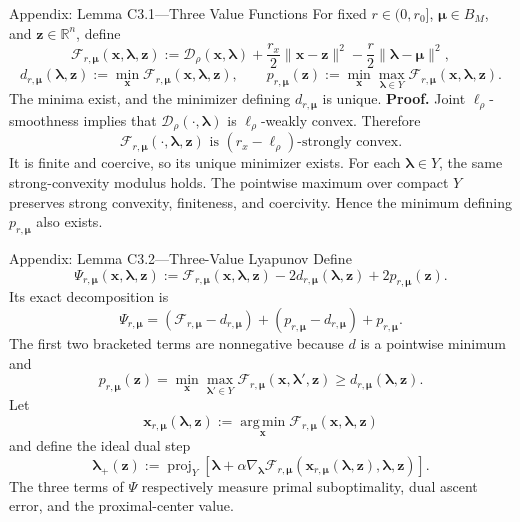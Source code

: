 \documentclass[handout,compress,9pt]{beamer}
\newcommand{\RR}{\mathbb{R}}
\newcommand{\bx}{\bm{x}}
\newcommand{\bz}{\bm{z}}
\newcommand{\bmu}{\bm{\mu}}
\newcommand{\blmbd}{\bm{\lambda}}
\begin{document}
\begin{frame}{Appendix: Lemma C3.1---Three Value Functions
\hfill\hyperlink{appendix:contents}{}}
\hypertarget{appendix:candidate-frozen}{}
\scriptsize
For fixed $r\in(0,r_0]$, $\bmu\in B_M$, and $\bz\in\RR^n$, define
\begin{equation*}
  \mathcal F_{r,\bmu}(\bx,\blmbd,\bz)
  :=\mathcal D_\rho(\bx,\blmbd)
  +\frac{r_x}{2}\|\bx-\bz\|^2
  -\frac r2\|\blmbd-\bmu\|^2,
\end{equation*}
\begin{equation*}
  d_{r,\bmu}(\blmbd,\bz)
  :=\min_{\bx}\mathcal F_{r,\bmu}(\bx,\blmbd,\bz),
  \qquad
  p_{r,\bmu}(\bz)
  :=\min_{\bx}\max_{\blmbd\in Y}\mathcal F_{r,\bmu}(\bx,\blmbd,\bz).
\end{equation*}
The minima exist, and the minimizer defining $d_{r,\bmu}$ is unique.
\noindent\textbf{Proof.}
Joint $\ell_\rho$-smoothness implies that
$\mathcal D_\rho(\cdot,\blmbd)$ is $\ell_\rho$-weakly convex.  Therefore
\begin{equation*}
  \mathcal F_{r,\bmu}(\cdot,\blmbd,\bz)
  \text{ is }(r_x-\ell_\rho)\text{-strongly convex}.
\end{equation*}
It is finite and coercive, so its unique minimizer exists.  For each
$\blmbd\in Y$, the same strong-convexity modulus holds.  The pointwise maximum
over compact $Y$ preserves strong convexity, finiteness, and coercivity.
Hence the minimum defining $p_{r,\bmu}$ also exists.
\end{frame}

\begin{frame}{Appendix: Lemma C3.2---Three-Value Lyapunov
\hfill\hyperlink{appendix:contents}{}}
\scriptsize
Define
\begin{equation*}
  \Psi_{r,\bmu}(\bx,\blmbd,\bz)
  :=\mathcal F_{r,\bmu}(\bx,\blmbd,\bz)
  -2d_{r,\bmu}(\blmbd,\bz)+2p_{r,\bmu}(\bz).
\end{equation*}
Its exact decomposition is
\begin{equation*}
  \Psi_{r,\bmu}
  =(\mathcal F_{r,\bmu}-d_{r,\bmu})
  +(p_{r,\bmu}-d_{r,\bmu})+p_{r,\bmu}.
\end{equation*}
The first two bracketed terms are nonnegative because $d$ is a pointwise
minimum and
\begin{equation*}
  p_{r,\bmu}(\bz)
  =\min_{\bx}\max_{\blmbd'\in Y}\mathcal F_{r,\bmu}(\bx,\blmbd',\bz)
  \ge d_{r,\bmu}(\blmbd,\bz).
\end{equation*}
Let
\begin{equation*}
  \bx_{r,\bmu}(\blmbd,\bz)
  :=\operatorname*{arg\,min}_{\bx}\mathcal F_{r,\bmu}(\bx,\blmbd,\bz)
\end{equation*}
and define the ideal dual step
\begin{equation*}
  \blmbd_+(\bz):=\operatorname{proj}_Y\left[
  \blmbd+\alpha\nabla_{\blmbd}\mathcal F_{r,\bmu}
  (\bx_{r,\bmu}(\blmbd,\bz),\blmbd,\bz)\right].
\end{equation*}
The three terms of $\Psi$ respectively measure primal suboptimality, dual
ascent error, and the proximal-center value.
\end{frame}
\end{document}
